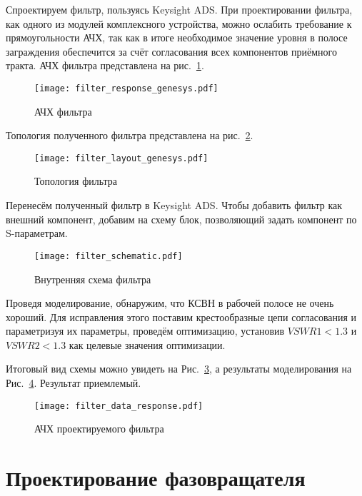 Спроектируем фильтр, пользуясь Keysight ADS.%
При проектировании фильтра, как одного из модулей комплексного устройства, можно ослабить требование к прямоугольности АЧХ, так как в итоге необходимое значение уровня в полосе заграждения обеспечится за счёт согласования всех компонентов приёмного тракта.
АЧХ фильтра представлена на рис.~\ref{fig:filter_response_genesys}.

\begin{figure}[!ht]
    \centering
    \texttt{[image: filter\_response\_genesys.pdf]}
    \caption{АЧХ фильтра}%
    \label{fig:filter_response_genesys}
\end{figure}

Топология полученного фильтра представлена на рис.~\ref{fig:filter_layout_genesys}.
\begin{figure}[!ht]
    \centering
    \texttt{[image: filter\_layout\_genesys.pdf]}
    \caption{Топология фильтра}%
    \label{fig:filter_layout_genesys}
\end{figure}

Перенесём полученный фильтр в Keysight ADS.%
Чтобы добавить фильтр как внешний компонент, добавим на схему блок, позволяющий задать компонент по S-параметрам.

\begin{figure}[!ht]
    \centering
    \texttt{[image: filter\_schematic.pdf]}
    \caption{Внутренняя схема фильтра}%
    \label{fig:filter_schematic}
\end{figure}

Проведя моделирование, обнаружим, что КСВН в рабочей полосе не очень хороший.
Для исправления этого поставим крестообразные цепи согласования и параметризуя их параметры, проведём оптимизацию, установив $VSWR1 < 1.3$ и $VSWR2 < 1.3$ как целевые значения оптимизации.

Итоговый вид схемы можно увидеть на Рис.~\ref{fig:filter_schematic}, а результаты моделирования на Рис.~\ref{fig:filter_data_response}.
Результат приемлемый.

\begin{figure}[!ht]
    \centering
    \texttt{[image: filter\_data\_response.pdf]}
    \caption{АЧХ проектируемого фильтра}%
    \label{fig:filter_data_response}
\end{figure}

\section{Проектирование фазовращателя}

